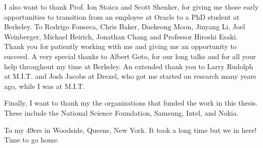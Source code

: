 \documentclass{ucbthesis}
\begin{document}
\begin{frontmatter}
\begin{acknowledgements}
I also want to thank Prof. Ion Stoica and Scott Shenker, for giving me those early opportunities to transition from an employee
at Oracle to a PhD student at Berkeley. To Rodrigo Fonseca, Chris Baker, Daekeong Moon, Jinyang Li, Joel Weinberger,
Michael Heirich, Jonathan Chang and
Professor Hiroshi Esaki.  Thank you for patiently working with me and giving me an opportunity to succeed.  
A very special thanks to Albert Goto, for our long talks and for all your help throughout my time at Berkeley.  
An extended
thank you to Larry Rudolph at M.I.T. and Josh Jacobs at Drexel, who got me started on research many years ago, while I was at M.I.T.

Finally, I want to thank my the organizations that funded the work in this thesis.  These include the National Science Foundation,
Samsung, Intel, and Nokia.

To my 49ers in Woodside, Queens, New York.  It took a long time but we in here!  Time to go home.








\end{acknowledgements}

\end{frontmatter}

\pagestyle{headings}




















\appendix


\printbibliography
\end{document}
